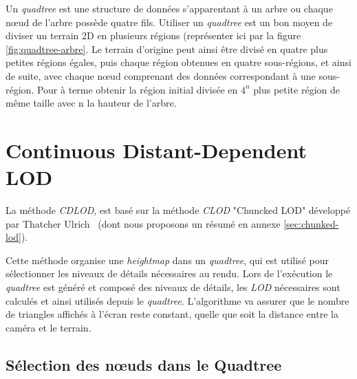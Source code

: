  Un \emph{quadtree} est une structure de données s'apparentant à un arbre ou chaque n\oe{}ud de l'arbre possède quatre fils. Utiliser un \emph{quadtree} est un bon moyen de diviser un terrain 2D en plusieurs régions (représenter ici par la figure \ref{fig:quadtree-arbre}. Le terrain d'origine peut ainsi être divisé en quatre plus petites régions égales, puis chaque région obtenues en quatre sous-régions, et ainsi de suite, avec chaque n\oe{}ud comprenant des données correspondant à une sous-région. Pour à terme obtenir la région initial divisée en $4^n$ plus petite région de même taille avec n la hauteur de l'arbre.

  
\vspace{1.5cm}

\section{Continuous Distant-Dependent LOD}


  La méthode \textit{CDLOD}, est basé sur la méthode \textit{CLOD} "Chuncked LOD" développé par Thatcher Ulrich~\cite{CLOD} (dont nous proposons un résumé en annexe \ref{sec:chunked-lod}).
  

  Cette méthode organise une \emph{heightmap} dans un \emph{quadtree}, qui est utilisé pour sélectionner les niveaux de détails nécessaires au rendu. Lors de l'exécution le \emph{quadtree} est généré et composé des niveaux de détails, les \emph{LOD} nécessaires sont calculés et ainsi utilisés depuis le \emph{quadtree}. L'algorithme va assurer que le nombre de triangles affichés à l'écran reste constant, quelle que soit la distance entre la caméra et le terrain.
  
 \subsection{Sélection des n\oe{}uds dans le Quadtree}
 
